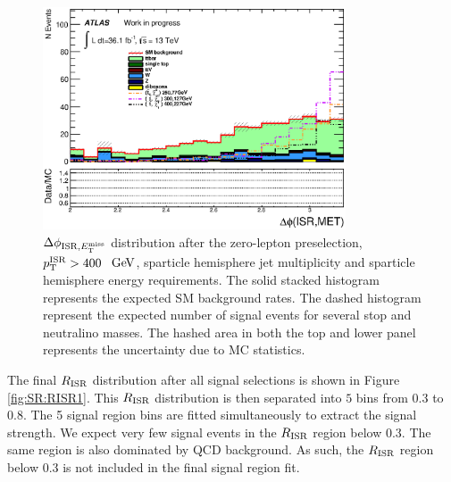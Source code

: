 \begin{figure}[h!]
  \begin{center}
     \includegraphics[width=0.80\textwidth]{figures/plotSR/SR_ND1_dphiISRI_6SR.eps}
  \caption[~$\dPhiISRMET$ distribution after the zero-lepton preselection, $\pTISR > 400$ $\gev$, sparticle hemisphere jet multiplicity and sparticle hemisphere energy requirements]{$\dPhiISRMET$ distribution after the zero-lepton preselection, $\pTISR > 400$ $\gev$, sparticle hemisphere jet multiplicity and sparticle hemisphere energy requirements. The solid stacked histogram represents the expected SM background rates. The dashed histogram represent the expected number of signal events for several stop and neutralino masses. The hashed area in both the top and lower panel represents the uncertainty due to MC statistics.}
  \label{fig:SR:dphiISRMET}
    \end{center}
\end{figure}

\indent The final $R_{\mathrm{ISR}}$ distribution after all signal selections is shown in Figure \ref{fig:SR:RISR1}.  This $R_{\mathrm{ISR}}$ distribution is then separated into $5$ bins from $0.3$ to $0.8$.  The 5 signal region bins are fitted simultaneously to extract the signal strength.  We expect very few signal events in the $R_{\mathrm{ISR}}$ region below 0.3. The same region is also dominated by QCD background.  As such, the $R_{\mathrm{ISR}}$ region below 0.3 is not included in the final signal region fit.  \\

